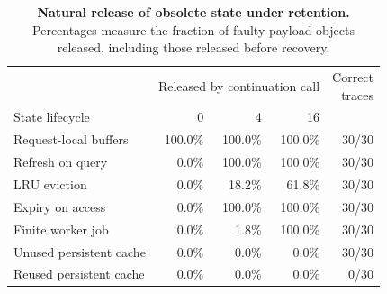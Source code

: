 \begin{table}[!ht]
\centering
\caption{\textbf{Natural release of obsolete state under retention.}
Percentages measure the fraction of faulty payload objects released,
including those released before recovery.}
\label{tab:process-lifetimes}
\footnotesize
\setlength{\tabcolsep}{3pt}
\begin{tabular}{@{}lrrrr@{}}
\toprule
& \multicolumn{3}{c}{Released by continuation call} & \shortstack{Correct\\traces} \\
\cmidrule(lr){2-4}
State lifecycle & 0 & 4 & 16 & \\
\midrule
Request-local buffers & 100.0\% & 100.0\% & 100.0\% & 30/30 \\
Refresh on query & 0.0\% & 100.0\% & 100.0\% & 30/30 \\
LRU eviction & 0.0\% & 18.2\% & 61.8\% & 30/30 \\
Expiry on access & 0.0\% & 100.0\% & 100.0\% & 30/30 \\
Finite worker job & 0.0\% & 1.8\% & 100.0\% & 30/30 \\
Unused persistent cache & 0.0\% & 0.0\% & 0.0\% & 30/30 \\
Reused persistent cache & 0.0\% & 0.0\% & 0.0\% & 0/30 \\
\bottomrule
\end{tabular}
\end{table}
